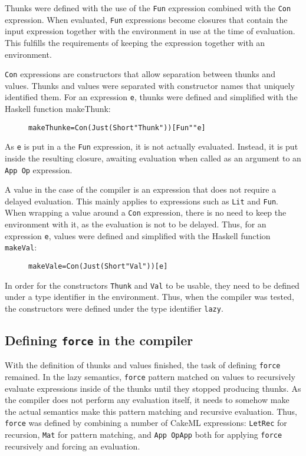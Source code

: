 Thunks were defined with the use of the \texttt{Fun} expression combined
with the \texttt{Con} expression. When evaluated, \texttt{Fun} expressions
become closures that contain the input expression together with the environment
in use at the time of evaluation. This fulfills the requirements of keeping
the expression together with an environment.

\texttt{Con} expressions are constructors that allow separation between thunks
and values. Thunks and values were separated with constructor names that
uniquely identified them. For an expression \texttt{e}, thunks were defined and
simplified with the Haskell function makeThunk:

\begin{figure}[H]
\begin{alltt}
  makeThunk e = Con (Just (Short "Thunk")) [Fun "" e]
\end{alltt}
\end{figure}

\noindent As \texttt{e} is put in a the \texttt{Fun} expression, it is not
actually evaluated. Instead, it is put inside the resulting closure, awaiting
evaluation when called as an argument to an \texttt{App Op} expression.

A value in the case of the compiler is an expression that does not require
a delayed evaluation. This mainly applies to expressions such as \texttt{Lit}
and \texttt{Fun}. When wrapping a value around a \texttt{Con} expression, there
is no need to keep the environment with it, as the evaluation is not to be
delayed. Thus, for an expression \texttt{e}, values were defined and simplified
with the Haskell function \texttt{makeVal}:

\begin{figure}[H]
\begin{alltt}
  makeVal e = Con (Just (Short "Val")) [e]
\end{alltt}
\end{figure}

In order for the constructors \texttt{Thunk} and \texttt{Val} to be usable,
they need to be defined under a type identifier in the environment. Thus,
when the compiler was tested, the constructors were defined under the type
identifier \texttt{lazy}.

\subsection{Defining \texttt{force} in the compiler}
With the definition of thunks and values finished, the task of defining
\texttt{force} remained. In the lazy semantics, \texttt{force} pattern
matched on values to recursively evaluate expressions inside of the thunks until
they stopped producing thunks. As the compiler does not perform any evaluation
itself, it needs to somehow make the actual semantics make this pattern matching
and recursive evaluation. Thus, \texttt{force} was defined by combining a number
of CakeML expressions: \texttt{LetRec} for recursion, \texttt{Mat} for pattern
matching, and \texttt{App OpApp} both for applying \texttt{force} recursively
and forcing an evaluation.

